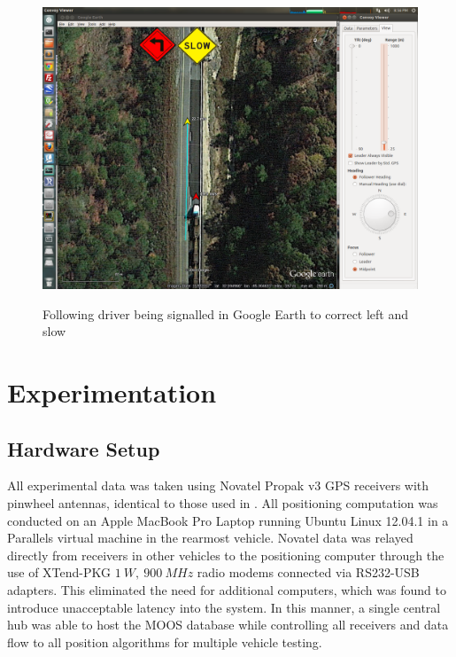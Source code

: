 \documentclass[12pt]{report}
\begin{document}
\begin{figure}[ht] \centering \label{fig:earth_dst}
    \includegraphics[width=6.5in]{./figs/earth_slow.png}
    \caption{Following driver being signalled in Google Earth to correct left and slow}
\end{figure}




\chapter{Experimentation}
\label{chap:exper}

\section{Hardware Setup} \label{sec:hardware}

All experimental data was taken using Novatel Propak v3 GPS receivers with pinwheel antennas, identical to those used in \cite{scottthesis}. All positioning computation was conducted on an Apple MacBook Pro Laptop running Ubuntu Linux 12.04.1 in a Parallels virtual machine in the rearmost vehicle. Novatel data was relayed directly from receivers in other vehicles to the positioning computer through the use of XTend-PKG $1~W,~900~MHz$ radio modems connected via RS232-USB adapters. This eliminated the need for additional computers, which was found to introduce unacceptable latency into the system. In this manner, a single central hub was able to host the MOOS database while controlling all receivers and data flow to all position algorithms for multiple vehicle testing.
\end{document}
